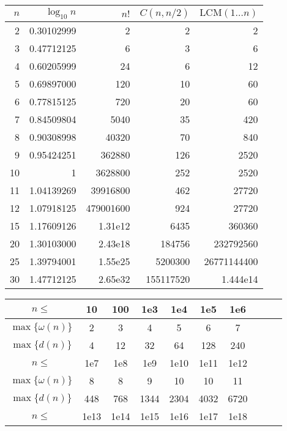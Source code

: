 \begin{table}[H]
	\centering
	\small
	\renewcommand\arraystretch{0.8}
	\begin{tabular}{|r|r|r|r|r|}
		\hline
		\rowcolor{black!10} $n$ & $\log_{10} n$ & $n!$ & $C(n,n/2)$ & $\mathrm{LCM}(1\dots n)$\\
		\hline
		2 & 0.30102999 & 2 & 2 & 2\\
		\hline
		3 & 0.47712125 & 6 & 3 & 6\\
		\hline
		4 & 0.60205999 & 24 & 6 & 12\\
		\hline
		5 & 0.69897000 & 120 & 10 & 60 \\
		\hline
		6 & 0.77815125 & 720 & 20 & 60 \\
		\hline
		7 & 0.84509804 & 5040 & 35 & 420 \\
		\hline
		8 & 0.90308998 & 40320 & 70 & 840\\
		\hline
		9 & 0.95424251 & 362880 & 126 & 2520\\
		\hline
		10 & 1 & 3628800 & 252  & 2520\\
		\hline
		11 & 1.04139269 & 39916800 & 462  & 27720 \\
		\hline
		12 & 1.07918125 & 479001600 & 924 & 27720\\
		\hline
		15 & 1.17609126 & 1.31e{12} & 6435 & 360360\\
		\hline
		20 & 1.30103000 & 2.43e{18} & 184756 & 232792560\\
		\hline
		25 & 1.39794001 & 1.55e{25} & 5200300 & 26771144400 \\
		\hline
		30 & 1.47712125 & 2.65e{32} & 155117520 & 1.444e{14}\\
		\hline
		\end{tabular}
		\begin{tabular}{|c|c|c|c|c|c|c|c|c|c|}
			\hline
			\rowcolor{black!10} $n \leq$ & 10 &  100 & 1e3 & 1e4 & 1e5 & 1e6 \\
			\hline
			$\max\{\omega(n)\}$ & 2 & 3 & 4 & 5 & 6 & 7  \\
			\hline
			$\max\{d(n)\}$ & 4 & 12 & 32 & 64 & 128 & 240 \\
			\hline
			\rowcolor{black!10} $n \leq$ & 1e7 & 1e8 & 1e9 & 1e10 & 1e11& 1e12\\
			\hline
			$\max\{\omega(n)\}$ & 8 & 8 & 9 & 10& 10 & 11 \\
			\hline
			$\max\{d(n)\}$ & 448 & 768 & 1344 & 2304 & 4032 & 6720 \\
			\hline
			\rowcolor{black!10} $n \leq$ & 1e13& 1e14& 1e15& 1e16& 1e17& 1e18 \\

\end{tabular}
\end{table}
